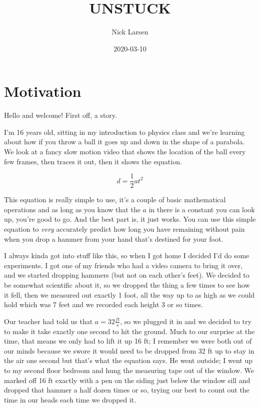 \documentclass[]{book}
\title{UNSTUCK}
\author{Nick Larsen}
\date{2020-03-10}
\begin{document}
\maketitle

{
\setcounter{tocdepth}{1}
\tableofcontents
}
\chapter*{Motivation}\label{motivation}

Hello and welcome! First off, a story.

I'm 16 years old, sitting in my introduction to physics class and we're
learning about how if you throw a ball it goes up and down in the shape
of a parabola. We look at a fancy slow motion video that shows the
location of the ball every few frames, then traces it out, then it shows
the equation.

\[d = \frac{1}{2}at^2\]

This equation is really simple to use, it's a couple of basic
mathematical operations and as long as you know that the \(a\) in there
is a constant you can look up, you're good to go. And the best part is,
it just works. You can use this simple equation to \emph{very}
accurately predict how long you have remaining without pain when you
drop a hammer from your hand that's destined for your foot.

I always kinda got into stuff like this, so when I got home I decided
I'd do some experiments. I got one of my friends who had a video camera
to bring it over, and we started dropping hammers (but not on each
other's feet). We decided to be somewhat scientific about it, so we
dropped the thing a few times to see how it fell, then we measured out
exactly 1 foot, all the way up to as high as we could hold which was 7
feet and we recorded each height 3 or so times.

Our teacher had told us that \(a = 32\frac{ft}{s}\), so we plugged it in
and we decided to try to make it take exactly one second to hit the
ground. Much to our surprise at the time, that means we only had to lift
it up 16 ft; I remember we were both out of our minds because we swore
it would need to be dropped from 32 ft up to stay in the air one second
but that's what the equation says. He went outside; I went up to my
second floor bedroom and hung the measuring tape out of the window. We
marked off 16 ft exactly with a pen on the siding just below the window
sill and dropped that hammer a half dozen times or so, trying our best
to count out the time in our heads each time we dropped it.
\end{document}
